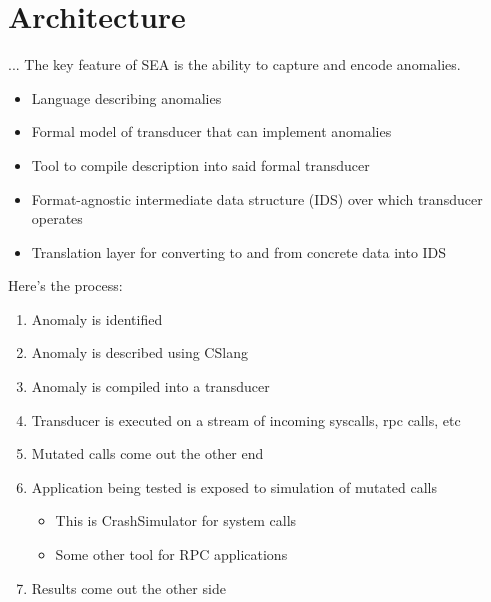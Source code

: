 \section{Architecture}
\label{SEC:architecture}

... The key feature of SEA is the ability to capture and encode anomalies.


\begin{itemize}
  \item{Language describing anomalies}
  \item{Formal model of transducer that can implement anomalies}
  \item{Tool to compile description into said formal transducer}
  \item{Format-agnostic intermediate data structure (IDS) over which transducer
  operates}
  \item{Translation layer for converting to and from concrete data into IDS}
\end{itemize}

Here's the process:

\begin{enumerate}
\item{Anomaly is identified}
\item{Anomaly is described using CSlang}
\item{Anomaly is compiled into a transducer}
\item{Transducer is executed on a stream of incoming syscalls, rpc calls, etc}
\item{Mutated calls come out the other end}
\item{Application being tested is exposed to simulation of mutated calls}
\begin{itemize}
\item{This is CrashSimulator for system calls}
\item{Some other tool for RPC applications}
\end{itemize}
\item{Results come out the other side}

\end{enumerate}
